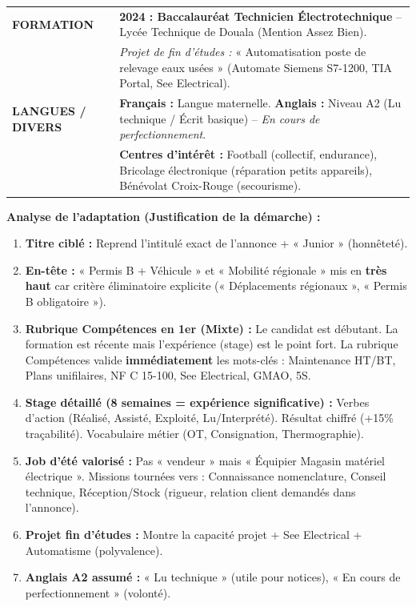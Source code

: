 \documentclass[11pt]{article}
\newcommand{\cle}[1]{{\popxbold\color{popdark}#1}}
\begin{document}
\begin{exoresolu}
\begin{center}
\begin{tabularx}{\linewidth}{|l|X|}
\textbf{FORMATION} & \textbf{2024 : Baccalauréat Technicien Électrotechnique} -- Lycée Technique de Douala (Mention Assez Bien). \\
& \emph{Projet de fin d'études :} « Automatisation poste de relevage eaux usées » (Automate Siemens S7-1200, TIA Portal, See Electrical). \\ \hline
\textbf{LANGUES / DIVERS} & \textbf{Français :} Langue maternelle. \textbf{Anglais :} Niveau A2 (Lu technique / Écrit basique) -- \emph{En cours de perfectionnement}. \\
& \textbf{Centres d'intérêt :} Football (collectif, endurance), Bricolage électronique (réparation petits appareils), Bénévolat Croix-Rouge (secourisme). \\ \hline
\end{tabularx}
\end{center}

\tcblower
\textbf{Analyse de l'adaptation (Justification de la démarche) :}
\begin{enumerate}
    \item \textbf{Titre ciblé :} Reprend l'intitulé exact de l'annonce + « Junior » (honnêteté).
    \item \textbf{En-tête :} « Permis B + Véhicule » et « Mobilité régionale » mis en \textbf{très haut} car critère éliminatoire explicite (« Déplacements régionaux », « Permis B obligatoire »).
    \item \textbf{Rubrique Compétences en 1er (Mixte) :} Le candidat est débutant. La formation est récente mais l'expérience (stage) est le point fort. La rubrique Compétences valide \textbf{immédiatement} les mots-clés : \cle{Maintenance HT/BT}, \cle{Plans unifilaires}, \cle{NF C 15-100}, \cle{See Electrical}, \cle{GMAO}, \cle{5S}.
    \item \textbf{Stage détaillé (8 semaines = expérience significative) :} Verbes d'action (\cle{Réalisé}, \cle{Assisté}, \cle{Exploité}, \cle{Lu/Interprété}). Résultat chiffré (\cle{+15\% traçabilité}). Vocabulaire métier (\cle{OT}, \cle{Consignation}, \cle{Thermographie}).
    \item \textbf{Job d'été valorisé :} Pas « vendeur » mais « Équipier Magasin matériel électrique ». Missions tournées vers : \cle{Connaissance nomenclature}, \cle{Conseil technique}, \cle{Réception/Stock} (rigueur, relation client demandés dans l'annonce).
    \item \textbf{Projet fin d'études :} Montre la capacité projet + See Electrical + Automatisme (polyvalence).
    \item \textbf{Anglais A2 assumé :} « Lu technique » (utile pour notices), « En cours de perfectionnement » (volonté).
\end{enumerate}
\end{exoresolu}
\end{document}
